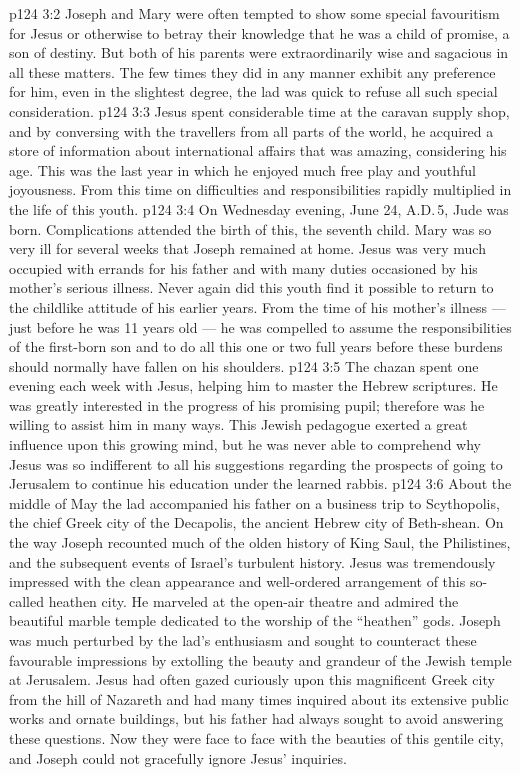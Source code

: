 \vs p124 3:2 Joseph and Mary were often tempted to show some special favouritism for Jesus or otherwise to betray their knowledge that he was a child of promise, a son of destiny. But both of his parents were extraordinarily wise and sagacious in all these matters. The few times they did in any manner exhibit any preference for him, even in the slightest degree, the lad was quick to refuse all such special consideration.
\vs p124 3:3 Jesus spent considerable time at the caravan supply shop, and by conversing with the travellers from all parts of the world, he acquired a store of information about international affairs that was amazing, considering his age. This was the last year in which he enjoyed much free play and youthful joyousness. From this time on difficulties and responsibilities rapidly multiplied in the life of this youth.
\vs p124 3:4 \pc On Wednesday evening, June 24, A.D.\,5, Jude was born. Complications attended the birth of this, the seventh child. Mary was so very ill for several weeks that Joseph remained at home. Jesus was very much occupied with errands for his father and with many duties occasioned by his mother’s serious illness. Never again did this youth find it possible to return to the childlike attitude of his earlier years. From the time of his mother’s illness --- just before he was 11 years old --- he was compelled to assume the responsibilities of the first\hyp{}born son and to do all this one or two full years before these burdens should normally have fallen on his shoulders.
\vs p124 3:5 The chazan spent one evening each week with Jesus, helping him to master the Hebrew scriptures. He was greatly interested in the progress of his promising pupil; therefore was he willing to assist him in many ways. This Jewish pedagogue exerted a great influence upon this growing mind, but he was never able to comprehend why Jesus was so indifferent to all his suggestions regarding the prospects of going to Jerusalem to continue his education under the learned rabbis.
\vs p124 3:6 \pc About the middle of May the lad accompanied his father on a business trip to Scythopolis, the chief Greek city of the Decapolis, the ancient Hebrew city of Beth\hyp{}shean. On the way Joseph recounted much of the olden history of King Saul, the Philistines, and the subsequent events of Israel’s turbulent history. Jesus was tremendously impressed with the clean appearance and well\hyp{}ordered arrangement of this so\hyp{}called heathen city. He marveled at the open\hyp{}air theatre and admired the beautiful marble temple dedicated to the worship of the “heathen” gods. Joseph was much perturbed by the lad’s enthusiasm and sought to counteract these favourable impressions by extolling the beauty and grandeur of the Jewish temple at Jerusalem. Jesus had often gazed curiously upon this magnificent Greek city from the hill of Nazareth and had many times inquired about its extensive public works and ornate buildings, but his father had always sought to avoid answering these questions. Now they were face to face with the beauties of this gentile city, and Joseph could not gracefully ignore Jesus’ inquiries.
